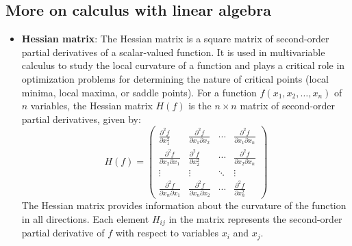 \documentclass{report}
\begin{document}
    \subsection{More on calculus with linear algebra}
    \begin{itemize}
        \item \textbf{Hessian matrix}: The Hessian matrix is a square matrix of second-order partial derivatives of a scalar-valued function. It is used in multivariable calculus to study the local curvature of a function and plays a critical role in optimization problems for determining the nature of critical points (local minima, local maxima, or saddle points).
            For a function $f(x_1, x_2, \dots, x_n)$ of $n$ variables, the Hessian matrix $H(f)$ is the $n \times n$ matrix of second-order partial derivatives, given by:
            \[
                H(f) = 
                \begin{pmatrix}
                    \frac{\partial^2 f}{\partial x_1^2} & \frac{\partial^2 f}{\partial x_1 \partial x_2} & \cdots & \frac{\partial^2 f}{\partial x_1 \partial x_n} \\
                    \frac{\partial^2 f}{\partial x_2 \partial x_1} & \frac{\partial^2 f}{\partial x_2^2} & \cdots & \frac{\partial^2 f}{\partial x_2 \partial x_n} \\
                    \vdots & \vdots & \ddots & \vdots \\
                    \frac{\partial^2 f}{\partial x_n \partial x_1} & \frac{\partial^2 f}{\partial x_n \partial x_2} & \cdots & \frac{\partial^2 f}{\partial x_n^2}
                \end{pmatrix}
            \]
            The Hessian matrix provides information about the curvature of the function in all directions. Each element $H_{ij}$ in the matrix represents the second-order partial derivative of $f$ with respect to variables $x_i$ and $x_j$.


\end{itemize}
\end{document}
